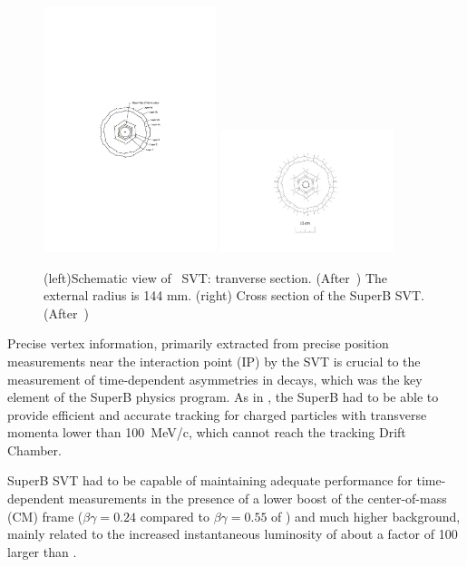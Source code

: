 \begin{figure}
\centering
\includegraphics[width=0.45\textwidth]{miniSVT.pdf}
\includegraphics[width=0.45\textwidth]{miniSuperBSVT.pdf}
\caption{\label{fig:svt} (left)Schematic view of \babar\ SVT: tranverse section. (After~\cite{AUBERT20021}) The external radius is 144 mm. (right) Cross section of the SuperB SVT. (After~\cite{Baszczyk:2013xua}) }
\end{figure}


Precise vertex information, primarily extracted from precise position measurements near the 
interaction point (IP) by the SVT  is crucial to the measurement of time-dependent \CP asymmetries 
in \Bz decays, which was the  key element of the SuperB physics program. As in \babar, the SuperB 
had to be able to provide efficient and accurate tracking for  charged particles with transverse 
momenta lower than 100~MeV/c, which cannot reach the tracking Drift Chamber.

SuperB SVT had to be capable of maintaining adequate performance for time-dependent 
measurements
 in the presence of a lower boost of the center-of-mass (CM) frame
($\beta\gamma = 0.24$ compared to $\beta\gamma = 0.55$ of \babar) and much higher background,
mainly related to the increased instantaneous luminosity of about a factor of 100 larger than \babar.

